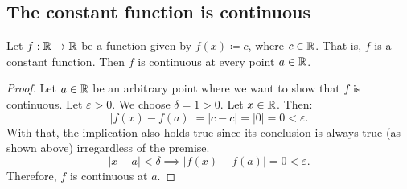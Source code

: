 \subsection{The constant function is continuous}

\begin{theorem}
    Let $f: \mathbb{R} \to \mathbb{R}$ be a function given by $f(x) \coloneqq c$, where $c \in \mathbb{R}$. That is, $f$ is a constant function. Then $f$ is continuous at every point $a \in \mathbb{R}$.
\end{theorem}

\begin{proof}
    Let $a \in \mathbb{R}$ be an arbitrary point where we want to show that $f$ is continuous. Let $\varepsilon > 0$. We choose $\delta = 1 > 0$. Let $x \in \mathbb{R}$. Then:
    \[
        |f(x) - f(a)| = |c - c| = |0| = 0 < \varepsilon.
    \]
    With that, the implication also holds true since its conclusion is always true (as shown above) irregardless of the premise.
    \[
        |x - a| < \delta \implies |f(x) - f(a)| = 0 < \varepsilon.
    \]
    Therefore, $f$ is continuous at $a$.
\end{proof}
